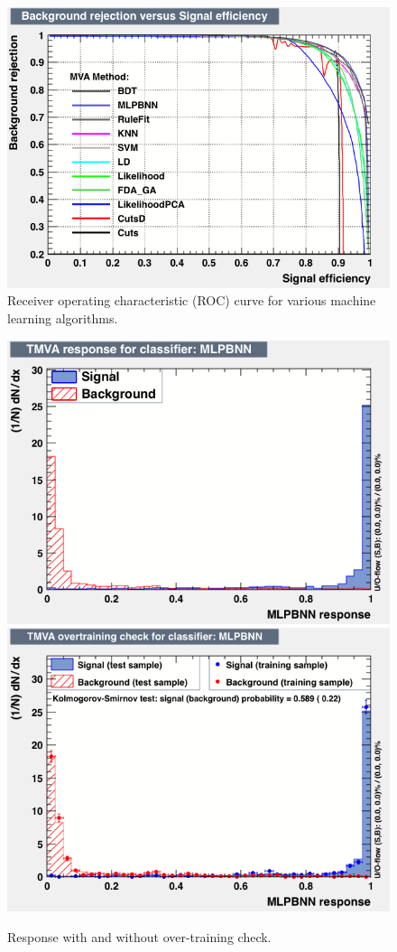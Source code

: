 \begin{figure}[h!]
\centering
\includegraphics[width=\textwidth]{figures/newTMVAplots/rejBvsS.png}
\caption{Receiver operating characteristic (ROC) curve for various machine learning algorithms.}
\label{fig:TMVANeuroc}
\end{figure}

\begin{figure}[h!]
\centering
\includegraphics[width=.49\textwidth]{figures/newTMVAplots/mva_MLPBNN.png}
\includegraphics[width=.49\textwidth]{figures/newTMVAplots/overtrain_MLPBNN.png}
\caption{Response with and without over-training check.}
\label{fig:TMVANeuresponce}
\end{figure}

